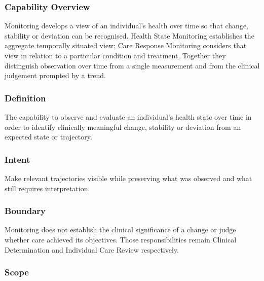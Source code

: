 \subsubsection*{Capability Overview}

Monitoring develops a view of an individual's health over time so that change, stability or deviation can be recognised. Health State Monitoring establishes the aggregate temporally situated view; Care Response Monitoring considers that view in relation to a particular condition and treatment. Together they distinguish observation over time from a single measurement and from the clinical judgement prompted by a trend.

\subsubsection*{Definition}

The capability to observe and evaluate an individual's health state over time in order to identify clinically meaningful change, stability or deviation from an expected state or trajectory.

\subsubsection*{Intent}

Make relevant trajectories visible while preserving what was observed and what still requires interpretation.

\subsubsection*{Boundary}

Monitoring does not establish the clinical significance of a change or judge whether care achieved its objectives. Those responsibilities remain Clinical Determination and Individual Care Review respectively.

\subsubsection*{Scope}
